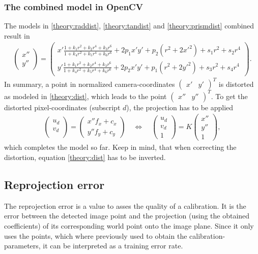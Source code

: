\subsubsection{The combined model in OpenCV}
The models in \ref{theory:raddist}, \ref{theory:tandist} and \ref{theory:prismdist} combined result in
\begin{align}
\begin{pmatrix}
x''\\
y''
\end{pmatrix}=
\begin{pmatrix}
x'\frac{1+k_1 r^2+k_2 r^4+k_3 r^6}{1+k_4 r^2+k_5r^4+k_6r^6}+2p_1 x' y'+p_2(r^2+2x'^2)+s_1 r^2+s_2 r^4\\
y'\frac{1+k_1 r^2+k_2 r^4+k_3 r^6}{1+k_4 r^2+k_5r^4+k_6r^6}+2p_2x'y'+p_1(r^2+2y'^2)+s_3 r^2+s_4 r^4
\end{pmatrix}\label{theory:dist}.
\end{align}
In summary, a point in normalized camera-coordinates $\begin{pmatrix}x'&y'\end{pmatrix}^T$ is distorted as modeled in \ref{theory:dist}, which leads to the point $\begin{pmatrix}x''&y''\end{pmatrix}^T$. To get the distorted pixel-coordinates (subscript $d$), the projection has to be applied
\begin{align*}
\begin{pmatrix}
u_d\\
v_d\\
\end{pmatrix}=
\begin{pmatrix}
x''f_x+c_x\\
y''f_y+c_y
\end{pmatrix}\quad\Leftrightarrow\quad
\begin{pmatrix}
u_d\\
v_d\\
1
\end{pmatrix}=K
\begin{pmatrix}
x''\\
y''\\
1
\end{pmatrix},
\end{align*}
which completes the model so far.
Keep in mind, that when correcting the distortion, equation \ref{theory:dist} has to be inverted.

\subsection{Reprojection error}
The reprojection error is a value to asses the quality of a calibration.
It is the error between the detected image point and the projection (using the obtained coefficients) of its corresponding world point onto the image plane.
Since it only uses the points, which where previously used to obtain the calibration-parameters, it can be interpreted as a training error rate.

